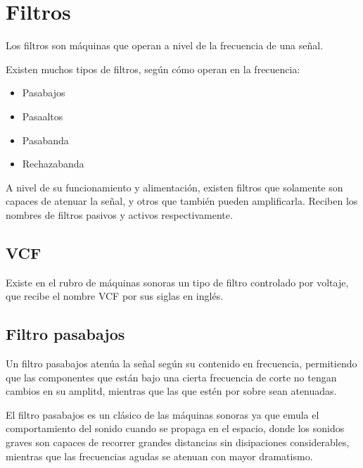 \documentclass[../principal.tex]{subfiles}
\begin{document}
\chapter{Filtros}

Los filtros son máquinas que operan a nivel de la frecuencia de una señal.

Existen muchos tipos de filtros, según cómo operan en la frecuencia:

\begin{itemize}
    \item Pasabajos
    \item Pasaaltos
    \item Pasabanda
    \item Rechazabanda
\end{itemize}

A nivel de su funcionamiento y alimentación, existen filtros que solamente son capaces de atenuar la señal, y otros que también pueden amplificarla. Reciben los nombres de filtros pasivos y activos respectivamente.

\section{VCF}

Existe en el rubro de máquinas sonoras un tipo de filtro controlado por voltaje, que recibe el nombre VCF por sus siglas en inglés.

\section{Filtro pasabajos}

Un filtro pasabajos atenúa la señal según su contenido en frecuencia, permitiendo que las componentes que están bajo una cierta frecuencia de corte no tengan cambios en su amplitd, mientras que las que estén por sobre sean atenuadas.

El filtro pasabajos es un clásico de las máquinas sonoras ya que emula el comportamiento del sonido cuando se propaga en el espacio, donde los sonidos graves son capaces de recorrer grandes distancias sin disipaciones considerables, mientras que las frecuencias agudas se atenuan con mayor dramatismo.

\newpage
\end{document}

